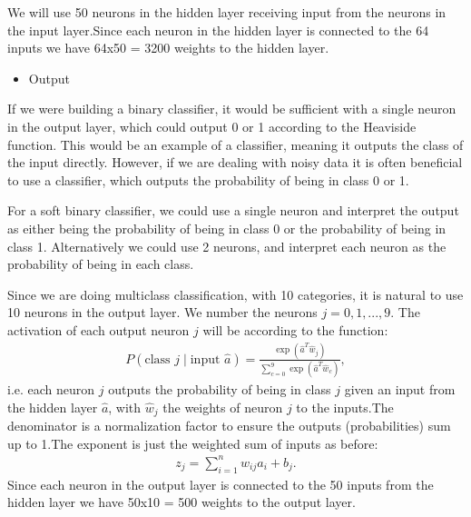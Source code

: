 \documentclass[letterpaper,10pt,english]{sphinxmanual}
\begin{document}
We will use 50 neurons in the hidden layer receiving input from the neurons in the input layer.Since each neuron in the hidden layer is connected to the 64 inputs we have 64x50 = 3200 weights to the hidden layer.
\begin{itemize}
\item {} 
Output

\end{itemize}

If we were building a binary classifier, it would be sufficient with a single neuron in the output layer,
which could output 0 or 1 according to the Heaviside function. This would be an example of a  classifier, meaning it outputs the class of the input directly. However, if we are dealing with noisy data it is often beneficial to use a  classifier, which outputs the probability of being in class 0 or 1.

For a soft binary classifier, we could use a single neuron and interpret the output as either being the probability of being in class 0 or the probability of being in class 1. Alternatively we could use 2 neurons, and interpret each neuron as the probability of being in each class.

Since we are doing multiclass classification, with 10 categories, it is natural to use 10 neurons in the output layer. We number the neurons \(j = 0,1,...,9\). The activation of each output neuron \(j\) will be according to the  function:
\begin{equation*}
\begin{split} P(\text{class $j$} \mid \text{input $\hat{a}$}) = \frac{\exp{(\hat{a}^T \hat{w}_j)}}
{\sum_{c=0}^{9} \exp{(\hat{a}^T \hat{w}_c)}} ,\end{split}
\end{equation*}
i.e. each neuron \(j\) outputs the probability of being in class \(j\) given an input from the hidden layer \(\hat{a}\), with \(\hat{w}_j\) the weights of neuron \(j\) to the inputs.The denominator is a normalization factor to ensure the outputs (probabilities) sum up to 1.The exponent is just the weighted sum of inputs as before:
\begin{equation*}
\begin{split} z_j = \sum_{i=1}^n w_ {ij} a_i+b_j.\end{split}
\end{equation*}
Since each neuron in the output layer is connected to the 50 inputs from the hidden layer we have 50x10 = 500
weights to the output layer.
\end{document}
